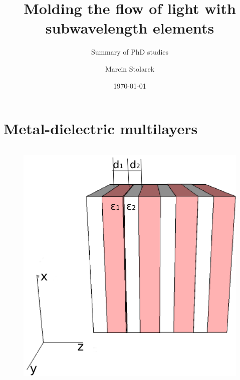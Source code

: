 \documentclass{beamer}
\title{Molding the flow of light with subwavelength elements}
\subtitle{Summary of PhD studies}
\author{Marcin Stolarek}
\institute{Information Optics Division, Faculty of Physics}
\date{\today}
\begin{document}
\renewcommand*{\bibfont}{\tiny}

\frame{\titlepage}

\frame{\tableofcontents}

\section{Metal-dielectric multilayers}
\begin{frame}
	\begin{columns}
		\begin{column}{0.5\textwidth}
			\begin{figure}
				\includegraphics[width=\textwidth]{../images/multilayer/multilayer-3d.png}\\
			

\end{figure}
\end{column}
\end{columns}
\end{frame}
\end{document}
